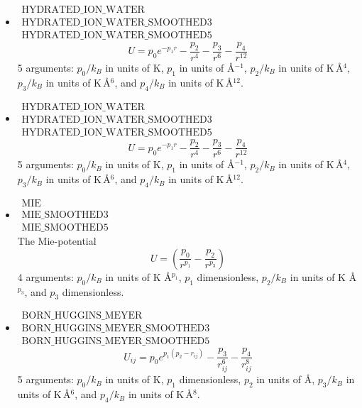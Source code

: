 \begin{itemize}
\item{$\begin{array}{l}\text{HYDRATED\_ION\_WATER}\\
      \text{HYDRATED\_ION\_WATER\_SMOOTHED3}\\
      \text{HYDRATED\_ION\_WATER\_SMOOTHED5}\end{array}$}\\
  \begin{equation}
    U= p_0 e^{-p_1 r}-\frac{p_2}{r^4}-\frac{p_3}{r^6}-\frac{p_4}{r^{12}}
  \end{equation}
  5 arguments: $p_0/k_B$ in units of K, $p_1$ in units of \AA$^{-1}$, $p_2/k_B$ in units of K\,\AA$^{4}$,
  $p_3/k_B$ in units of K\,\AA$^{6}$, and $p_4/k_B$ in units of K\,\AA$^{12}$.

\item{$\begin{array}{l}\text{HYDRATED\_ION\_WATER}\\
      \text{HYDRATED\_ION\_WATER\_SMOOTHED3}\\
      \text{HYDRATED\_ION\_WATER\_SMOOTHED5}\end{array}$}\\
  \begin{equation}
    U= p_0 e^{-p_1 r}-\frac{p_2}{r^4}-\frac{p_3}{r^6}-\frac{p_4}{r^{12}}
  \end{equation}
  5 arguments: $p_0/k_B$ in units of K, $p_1$ in units of \AA$^{-1}$, $p_2/k_B$ in units of K\,\AA$^{4}$,
  $p_3/k_B$ in units of K\,\AA$^{6}$, and $p_4/k_B$ in units of K\,\AA$^{12}$.

\item{$\begin{array}{l}\text{MIE}\\
      \text{MIE\_SMOOTHED3}\\
      \text{MIE\_SMOOTHED5}\end{array}$}\\
The Mie-potential \cite{Mie1903}
  \begin{equation}
    U= 
      \left(\frac{p_0}{r^{p_1}}-\frac{p_2}{r^{p_3}}\right)
  \end{equation}
   4 arguments: $p_0/k_B$ in units of K \AA$^{p_1}$, $p_1$ dimensionless,
  $p_2/k_B$ in units of K \AA$^{p_3}$, and $p_3$ dimensionless.

\item{$\begin{array}{l}\text{BORN\_HUGGINS\_MEYER}\\
      \text{BORN\_HUGGINS\_MEYER\_SMOOTHED3}\\
      \text{BORN\_HUGGINS\_MEYER\_SMOOTHED5}\end{array}$}\\
  \begin{equation}
    U_{ij}=p_0 e^{p_1\left(p_2-r_{ij}\right)}-\frac{p_3}{r_{ij}^6}-\frac{p_4}{r_{ij}^8}
  \end{equation}
  5 arguments: $p_0/k_B$ in units of K, $p_1$ dimensionless, $p_2$ in units of \AA, $p_3/k_B$ in units of K\,\AA$^{6}$, and
  $p_4/k_B$ in units of K\,\AA$^{8}$.


\end{itemize}
